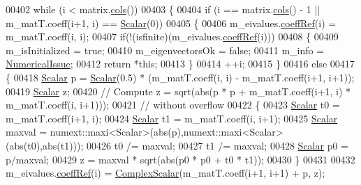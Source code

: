 \begin{DoxyCode}
00402     \textcolor{keywordflow}{while} (i < matrix.\hyperlink{group___core___module_a7b0b45c7351847696c911ce8aa2abbdb}{cols}()) 
00403     \{
00404       \textcolor{keywordflow}{if} (i == matrix.\hyperlink{group___core___module_a7b0b45c7351847696c911ce8aa2abbdb}{cols}() - 1 || m\_matT.coeff(i+1, i) == \hyperlink{group___eigenvalues___module_a017d49fe0d59874b70a2fcf35e5aa373}{Scalar}(0)) 
00405       \{
00406         m\_eivalues.\hyperlink{class_eigen_1_1_plain_object_base_a25626a55b26a4323565f79d1b7c48ea8}{coeffRef}(i) = m\_matT.coeff(i, i);
00407         \textcolor{keywordflow}{if}(!(isfinite)(m\_eivalues.\hyperlink{class_eigen_1_1_plain_object_base_a25626a55b26a4323565f79d1b7c48ea8}{coeffRef}(i)))
00408         \{
00409           m\_isInitialized = \textcolor{keyword}{true};
00410           m\_eigenvectorsOk = \textcolor{keyword}{false};
00411           m\_info = \hyperlink{group__enums_gga85fad7b87587764e5cf6b513a9e0ee5eaaf9b736d310a664e7729d163a035cc5f}{NumericalIssue};
00412           \textcolor{keywordflow}{return} *\textcolor{keyword}{this};
00413         \}
00414         ++i;
00415       \}
00416       \textcolor{keywordflow}{else}
00417       \{
00418         \hyperlink{group___eigenvalues___module_a017d49fe0d59874b70a2fcf35e5aa373}{Scalar} p = \hyperlink{group___eigenvalues___module_a017d49fe0d59874b70a2fcf35e5aa373}{Scalar}(0.5) * (m\_matT.coeff(i, i) - m\_matT.coeff(i+1, i+1));
00419         \hyperlink{group___eigenvalues___module_a017d49fe0d59874b70a2fcf35e5aa373}{Scalar} z;
00420         \textcolor{comment}{// Compute z = sqrt(abs(p * p + m\_matT.coeff(i+1, i) * m\_matT.coeff(i, i+1)));}
00421         \textcolor{comment}{// without overflow}
00422         \{
00423           \hyperlink{group___eigenvalues___module_a017d49fe0d59874b70a2fcf35e5aa373}{Scalar} t0 = m\_matT.coeff(i+1, i);
00424           \hyperlink{group___eigenvalues___module_a017d49fe0d59874b70a2fcf35e5aa373}{Scalar} t1 = m\_matT.coeff(i, i+1);
00425           \hyperlink{group___eigenvalues___module_a017d49fe0d59874b70a2fcf35e5aa373}{Scalar} maxval = numext::maxi<Scalar>(abs(p),numext::maxi<Scalar>(abs(t0),abs(t1)));
00426           t0 /= maxval;
00427           t1 /= maxval;
00428           \hyperlink{group___eigenvalues___module_a017d49fe0d59874b70a2fcf35e5aa373}{Scalar} p0 = p/maxval;
00429           z = maxval * sqrt(abs(p0 * p0 + t0 * t1));
00430         \}
00431         
00432         m\_eivalues.\hyperlink{class_eigen_1_1_plain_object_base_a25626a55b26a4323565f79d1b7c48ea8}{coeffRef}(i)   = \hyperlink{group___eigenvalues___module_a4d0b2a773357d0a6ec98e026f04002ed}{ComplexScalar}(m\_matT.coeff(i+1, i+1) + p, z);

\end{DoxyCode}
